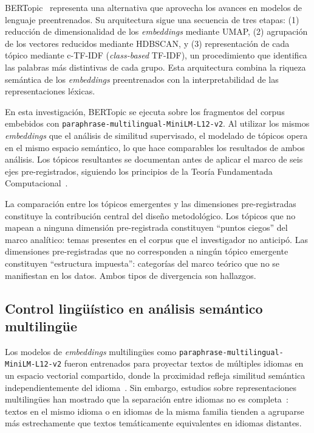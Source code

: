 BERTopic~\citep{grootendorst2022bertopic} representa una alternativa que aprovecha los avances en modelos de lenguaje preentrenados. Su arquitectura sigue una secuencia de tres etapas: (1) reducción de dimensionalidad de los \textit{embeddings} mediante UMAP, (2) agrupación de los vectores reducidos mediante HDBSCAN, y (3) representación de cada tópico mediante c-TF-IDF (\textit{class-based} TF-IDF), un procedimiento que identifica las palabras más distintivas de cada grupo. Esta arquitectura combina la riqueza semántica de los \textit{embeddings} preentrenados con la interpretabilidad de las representaciones léxicas.

En esta investigación, BERTopic se ejecuta sobre los fragmentos del corpus embebidos con \texttt{paraphrase-multilingual-MiniLM-L12-v2}. Al utilizar los mismos \textit{embeddings} que el análisis de similitud supervisado, el modelado de tópicos opera en el mismo espacio semántico, lo que hace comparables los resultados de ambos análisis. Los tópicos resultantes se documentan antes de aplicar el marco de seis ejes pre-registrados, siguiendo los principios de la Teoría Fundamentada Computacional~\citep{nelson2020computational}.

La comparación entre los tópicos emergentes y las dimensiones pre-registradas constituye la contribución central del diseño metodológico. Los tópicos que no mapean a ninguna dimensión pre-registrada constituyen ``puntos ciegos'' del marco analítico: temas presentes en el corpus que el investigador no anticipó. Las dimensiones pre-registradas que no corresponden a ningún tópico emergente constituyen ``estructura impuesta'': categorías del marco teórico que no se manifiestan en los datos. Ambos tipos de divergencia son hallazgos.


\subsection{Control lingüístico en análisis semántico multilingüe}

Los modelos de \textit{embeddings} multilingües como \texttt{paraphrase-multilingual-MiniLM-L12-v2} fueron entrenados para proyectar textos de múltiples idiomas en un espacio vectorial compartido, donde la proximidad refleja similitud semántica independientemente del idioma~\citep{reimers2019sentencebert}. Sin embargo, estudios sobre representaciones multilingües han mostrado que la separación entre idiomas no es completa~\citep{conneau2020unsupervised}: textos en el mismo idioma o en idiomas de la misma familia tienden a agruparse más estrechamente que textos temáticamente equivalentes en idiomas distantes.

